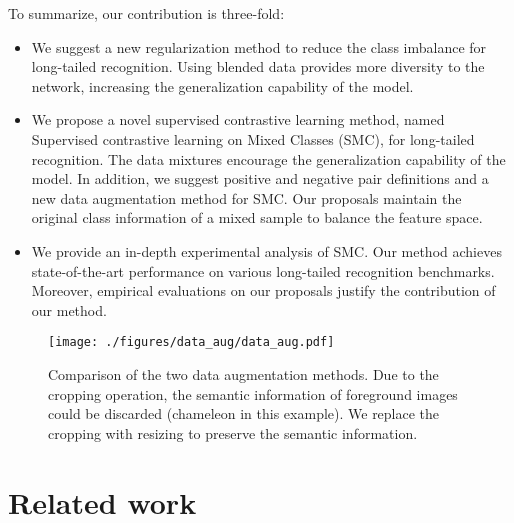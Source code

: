 \documentclass[10pt,twocolumn,letterpaper]{article}
\begin{document}
To summarize, our contribution is three-fold:
\begin{itemize}
    \item We suggest a new regularization method to reduce the class imbalance for long-tailed recognition. Using blended data provides more diversity to the network, increasing the generalization capability of the model.
    \item We propose a novel supervised contrastive learning method, named Supervised contrastive learning on Mixed Classes (SMC), for long-tailed recognition. The data mixtures encourage the generalization capability of the model. In addition, we suggest positive and negative pair definitions and a new data augmentation method for SMC. Our proposals maintain the original class information of a mixed sample to balance the feature space.
    \item We provide an in-depth experimental analysis of SMC. Our method achieves state-of-the-art performance on various long-tailed recognition benchmarks. Moreover, empirical evaluations on our proposals justify the contribution of our method.
\end{itemize}


\begin{figure}[t]
    \centering
     \texttt{[image: ./figures/data\_aug/data\_aug.pdf]}
    \caption{Comparison of the two data augmentation methods. Due to the cropping operation, the semantic information of foreground images could be discarded (chameleon in this example). We replace the cropping with resizing to preserve the semantic information.}
    \label{SMCfig:mixup_comparison}
\end{figure}

\section{Related work}
\label{SMCsec:relwork}
\end{document}

